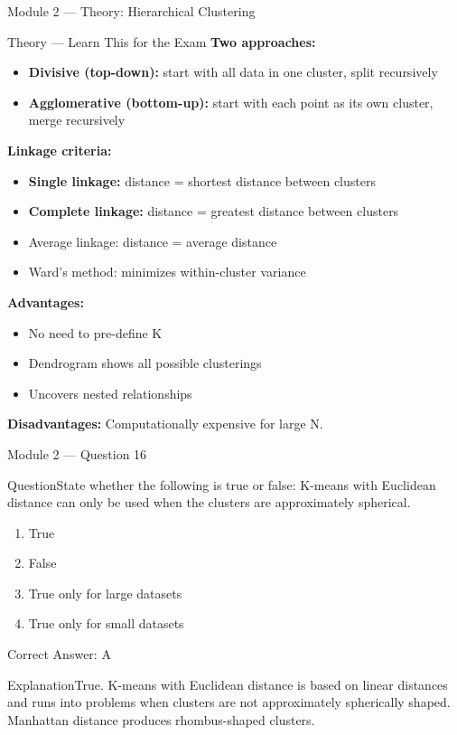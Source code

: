 \documentclass[aspectratio=169,10pt]{beamer}
\newcommand{\question}[1]{\begin{block}{Question}#1\end{block}}
\newcommand{\options}[4]{%
	\begin{enumerate}[label=\Alph*.,leftmargin=*]
		\item #1
		\item #2
		\item #3
		\item #4
	\end{enumerate}
}
\newcommand{\answerbox}[1]{\begin{exampleblock}{Correct Answer: #1}\end{exampleblock}}
\newcommand{\explain}[1]{\begin{block}{Explanation}#1\end{block}}
\newcommand{\theory}[1]{%
	\begin{block}{Theory --- Learn This for the Exam}
		\small #1
	\end{block}
}
\begin{document}
	\begin{frame}{Module 2 --- Theory: Hierarchical Clustering}
		\theory{
			\textbf{Two approaches:}
			\begin{itemize}
				\item \textbf{Divisive (top-down):} start with all data in one cluster, split recursively
				\item \textbf{Agglomerative (bottom-up):} start with each point as its own cluster, merge recursively
			\end{itemize}
			\textbf{Linkage criteria:}
			\begin{itemize}
				\item \textbf{Single linkage:} distance = shortest distance between clusters
				\item \textbf{Complete linkage:} distance = greatest distance between clusters
				\item Average linkage: distance = average distance
				\item Ward's method: minimizes within-cluster variance
			\end{itemize}
			\textbf{Advantages:}
			\begin{itemize}
				\item No need to pre-define K
				\item Dendrogram shows all possible clusterings
				\item Uncovers nested relationships
			\end{itemize}
			\textbf{Disadvantages:} Computationally expensive for large N.
		}
	\end{frame}
	
	\begin{frame}{Module 2 --- Question 16}
		\question{State whether the following is true or false: K-means with Euclidean distance can only be used when the clusters are approximately spherical.}
		\options{True}{False}{True only for large datasets}{True only for small datasets}
		\answerbox{A}
		\explain{True. K-means with Euclidean distance is based on linear distances and runs into problems when clusters are not approximately spherically shaped. Manhattan distance produces rhombus-shaped clusters.}
	\end{frame}
	
\end{document}
